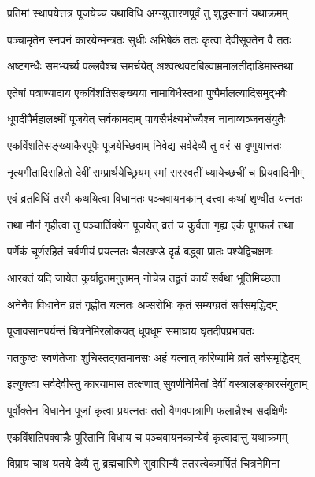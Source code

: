 \begin{center}
\twolineshloka
{प्रतिमां स्थापयेत्तत्र पूजयेच्च यथाविधि}
{अग्न्युत्तारणपूर्वं तु शुद्धस्नानं यथाक्रमम्}%


\twolineshloka
{पञ्चामृतेन स्नपनं कारयेन्मन्त्रतः सुधीः}
{अभिषेकं ततः कृत्वा देवीसूक्तेन वै ततः}%


\twolineshloka
{अष्टगन्धैः समभ्यर्च्य पल्लवैश्च समर्चयेत्}
{अश्वत्थवटबिल्वाम्रमालतीदाडिमास्तथा}%


\twolineshloka
{एतेषां पत्राण्यादाय एकविंशतिसङ्ख्यया}
{नामाविधैस्तथा पुष्पैर्मालत्यादिसमुद्भवैः}%


\twolineshloka
{धूपदीपैर्महालक्ष्मीं पूजयेत् सर्वकामदाम्}
{पायसैर्भक्ष्यभोज्यैश्च नानाव्यञ्जनसंयुतैः}%


\twolineshloka
{एकविंशतिसङ्ख्याकैरपूपैः पूजयेच्छिवाम्}
{निवेद्य सर्वदेव्यै तु वरं स वृणुयात्ततः}%


\twolineshloka
{नृत्यगीतादिसहितो देवीं सम्प्रार्थयेच्छ्रियम्}
{रमां सरस्वतीं ध्यायेच्छचीं च प्रियवादिनीम्}%


\twolineshloka
{एवं व्रतविधिं तस्मै कथयित्वा विधानतः}
{पञ्चवायनकान् दत्त्वा कथां शृण्वीत यत्नतः}%


\twolineshloka
{तथा मौनं गृहीत्वा तु पञ्चार्तिक्येन पूजयेत्}
{व्रतं च कुर्वता गृह्य एकं पूगफलं तथा}%


\twolineshloka
{पर्णेकं चूर्णरहितं चर्वणीयं प्रयत्नतः}
{चैलखण्डे दृढं बद्ध्वा प्रातः पश्येद्विचक्षणः}%


\twolineshloka
{आरक्तं यदि जायेत कुर्याद्व्रतमनुतमम्}
{नोचेन्न तद्व्रतं कार्यं सर्वथा भूतिमिच्छता}%


\twolineshloka
{अनेनैव विधानेन व्रतं गृह्णीत यत्नतः}
{अप्सरोभिः कृतं सम्यग्व्रतं सर्वसमृद्धिदम्}%


\twolineshloka
{पूजावसानपर्यन्तं चित्रनेमिरलोकयत्}
{धूपधूमं समाघ्राय घृतदीपप्रभावतः}%


\twolineshloka
{गतकुष्ठः स्वर्णतेजाः शुचिस्तद्गतमानसः}
{अहं यत्नात् करिष्यामि व्रतं सर्वसमृद्धिदम्}%


\twolineshloka
{इत्युक्त्वा सर्वदेवीस्तु कारयामास तत्क्षणात्}
{सुवर्णनिर्मितां देवीं वस्त्रालङ्कारसंयुताम्}%


\twolineshloka
{पूर्वोक्तेन विधानेन पूजां कृत्वा प्रयत्नतः}
{ततो वैणवपात्राणि फलान्नैश्च सदक्षिणैः}%


\twolineshloka
{एकविंशतिपक्वान्नैः पूरितानि विधाय च}
{पञ्चवायनकान्येवं कृत्वादात्तु यथाक्रमम्}%


\twolineshloka
{विप्राय चाथ यतये देव्यै तु ब्रह्मचारिणे}
{सुवासिन्यै ततस्त्वेकमर्पितं चित्रनेमिना}%



\end{center}
